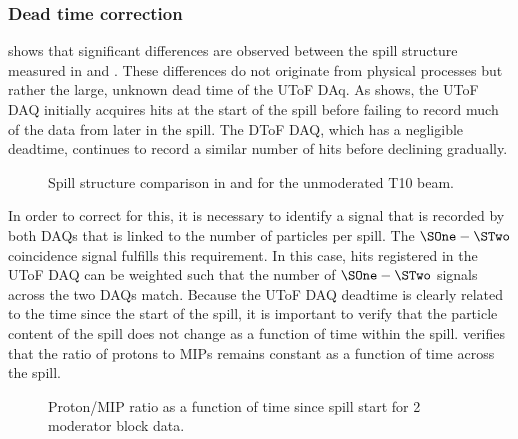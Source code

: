 \subsubsection{Dead time correction}
\label{sec:hptpc_beam_flux:methods:s3:deadtime}

 shows that significant differences are observed between the spill structure measured in \SThree and \SFour.
These differences do not originate from physical processes but rather the large, unknown dead time of the UToF DAq.
As  shows, the UToF DAQ initially acquires hits at the start of the spill before failing to record much of the data from later in the spill.
The DToF DAQ, which has a negligible deadtime, continues to record a similar number of hits before declining gradually.

\begin{figure}[h]
  \begin{adjustbox}{max totalsize=.75\textwidth, center}
    
  \end{adjustbox}
  \caption[Spill structure comparison in \SThree and \SFour]{Spill structure comparison in \SThree and \SFour for the unmoderated T10 beam.}
  \label{fig:spillStructureComp}
\end{figure}

In order to correct for this, it is necessary to identify a signal that is recorded by both DAQs that is linked to the number of particles per spill.
The $\SOne-\STwo$ coincidence signal fulfills this requirement.
In this case, hits registered in the UToF DAQ can be weighted such that the number of $\SOne-\STwo$ signals across the two DAQs match.
Because the UToF DAQ deadtime is clearly related to the time since the start of the spill, it is important to verify that the particle content of the spill does not change as a function of time within the spill.
 verifies that the ratio of protons to MIPs remains constant as a function of time across the spill.

\begin{figure}[h]
  \begin{adjustbox}{max totalsize=.75\textwidth, center}
    
  \end{adjustbox}
  \caption[Proton/MIP ratio as a function of time since spill start]{Proton/MIP ratio as a function of time since spill start for 2 moderator block data.}
  \label{fig:proMipRatio}
\end{figure}

